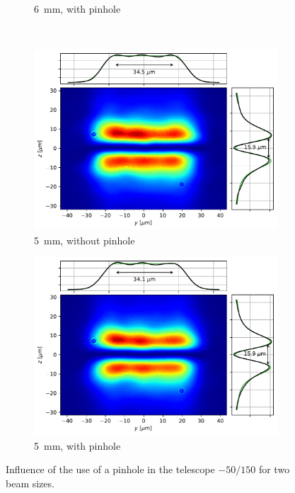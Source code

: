\begin{figure}
\begin{subfigure}{0.45\textwidth}
        \caption{\SI{6}{mm}, with pinhole}
    \end{subfigure}\\
    \vspace{0.3cm}
    \begin{subfigure}{0.45\textwidth}
        \includegraphics[width=\textwidth]{chapters/chapter_3/figures/small_nopin.pdf}
        \caption{\SI{5}{mm}, without pinhole}
    \end{subfigure}
    \hfill
    \begin{subfigure}{0.45\textwidth}
        \includegraphics[width=\textwidth]{chapters/chapter_3/figures/small_pin.pdf}
        \caption{\SI{5}{mm}, with pinhole}
    \end{subfigure}
    \caption{Influence of the use of a pinhole in the telescope $-50/150$ for two beam sizes.}
    \label{fig:pin}
\end{figure}

